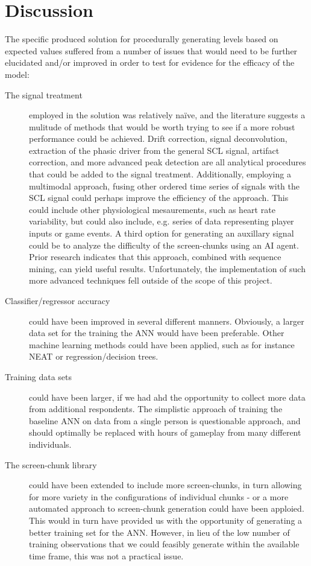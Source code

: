 \documentclass{llncs}
\begin{document}
\section{Discussion}
The specific produced solution for procedurally generating levels based on expected values suffered from a number of issues that would need to be further elucidated and/or improved in order to test for evidence for the efficacy of the model:
\begin{description}
\item [The signal treatment] employed in the solution was relatively naïve, and the literature suggests a mulitude of methods that would be worth trying to see if a more robust performance could be achieved. Drift correction, signal deconvolution, extraction of the phasic driver from the general SCL signal, artifact correction, and more advanced peak detection are all analytical procedures that could be added to the signal treatment.
Additionally, employing a multimodal approach, fusing other ordered time series of signals with the SCL signal could perhaps improve the efficiency of the approach\cite{martinez2011mining}. This could include other physiological mesaurements, such as heart rate variability, but could also include, e.g. series of data representing player inputs or game events. A third option for generating an auxillary signal could be to analyze the difficulty of the screen-chunks using an AI agent. Prior research indicates that this approach, combined with sequence mining, can yield useful results. Unfortunately, the implementation of such more advanced techniques fell outside of the scope of this project.
\item [Classifier/regressor accuracy] could have been improved in several different manners. Obviously, a larger data set for the training the ANN would have been preferable. Other machine learning methods could have been applied, such as for instance NEAT or regression/decision trees\cite{liu2009dynamic}.
\item [Training data sets] could have been larger, if we had ahd the opportunity to collect more data from additional respondents. The simplistic approach of training the baseline ANN on data from a single person is questionable approach, and should optimally be replaced with hours of gameplay from many different individuals.
\item [The screen-chunk library] could have been extended to include more screen-chunks, in turn allowing for more variety in the configurations of individual chunks - or a more automated approach to screen-chunk generation could have been apploied\cite{shaker2011feature}. This would in turn have provided us with the opportunity of generating a better training set for the ANN. However, in lieu of the low number of training observations that we could feasibly generate within the available time frame, this was not a practical issue.
\end{description}
\end{document}
